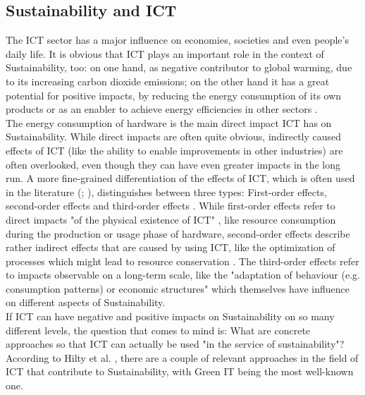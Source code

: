 \documentclass[oribibl]{llncs}
\begin{document}
\subsection{Sustainability and ICT}
The ICT sector has a major influence on economies, societies and even people's daily life. It is obvious that ICT plays an important role in the context of Sustainability, too: on one hand, as negative contributor to global warming, due to its increasing carbon dioxide emissions; on the other hand it has a great potential for positive impacts, by reducing the energy consumption of its own products or as an enabler to achieve energy efficiencies in other sectors \cite{smart2020}.\\
The energy consumption of hardware is the main direct impact ICT has on Sustainability. While direct impacts are often quite obvious, indirectly caused effects of ICT (like the ability to enable improvements in other industries) are often overlooked, even though they can have even greater impacts in the long run. A more fine-grained differentiation of the effects of ICT, which is often used in the literature (\cite{hilty_relevance_2006}; \cite{naumann_greensoft_2011}), distinguishes between three types: First-order effects, second-order effects and third-order effects \cite{berkhout_impacts_2001}. While first-order effects refer to direct impacts "of the physical existence of ICT" \cite{hilty_relevance_2006}, like resource consumption during the production or usage phase of hardware, second-order effects describe rather indirect effects that are caused by using ICT, like the optimization of processes which might lead to resource conservation \cite{naumann_greensoft_2011}. The third-order effects refer to impacts observable on a long-term scale, like the "adaptation of behaviour (e.g. consumption patterns) or economic structures" \cite{hilty_relevance_2006} which themselves have influence on different aspects of Sustainability.\\  
If ICT can have negative and positive impacts on Sustainability on so many different levels, the question that comes to mind is: What are concrete approaches so that ICT can actually be used "in the service of sustainability"\cite[p.\,5]{hilty11}? According to Hilty et al. \cite{hilty11}, there are a couple of relevant approaches in the field of ICT that contribute to Sustainability, with Green IT being the most well-known one.
\end{document}
